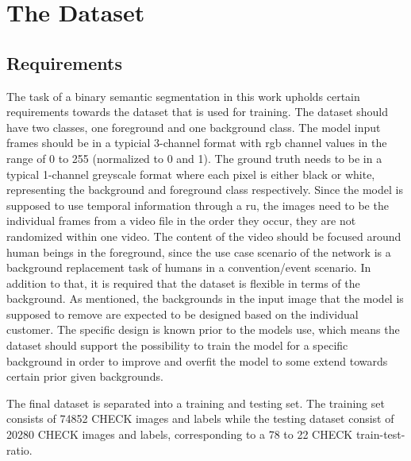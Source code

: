 \documentclass[11pt,
  paper=a4, 
  bibliography=totocnumbered,
	captions=tableheading,
	BCOR=10mm
]{scrreprt}
\theoremstyle{definition}
\begin{document}
\section{The Dataset}\label{sec:Dataset}
\subsection{Requirements}\label{sec:Requirements}
The task of a binary semantic segmentation in this work upholds certain requirements towards the dataset that is used for training.
The dataset should have two classes, one foreground and one background class.
The model input frames should be in a typicial 3-channel format with \gls{rgb} channel values in the range of 0 to 255 (normalized to 0 and 1). 
The ground truth needs to be in a typical 1-channel greyscale format where each pixel is either black or white, representing the background and foreground class respectively.
Since the model is supposed to use temporal information through a \gls{ru}, the images need to be the individual frames from a video file in the order they occur, they are not randomized within one video.
The content of the video should be focused around human beings in the foreground, since the use case scenario of the network is a background replacement task of humans in a convention/event scenario.
In addition to that, it is required that the dataset is flexible in terms of the background.
As mentioned, the backgrounds in the input image that the model is supposed to remove are expected to be designed based on the individual customer.
The specific design is known prior to the models use, which means the dataset should support the possibility to train the model for a specific background in order to improve and overfit the model to some extend towards certain prior given backgrounds.

The final dataset is separated into a training and testing set.
The training set consists of 74852 CHECK images and labels while the testing dataset consist of 20280 CHECK images and labels, corresponding to a 78 to 22 CHECK train-test-ratio.
\end{document}
